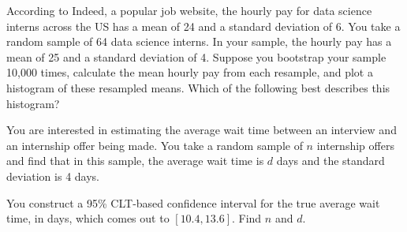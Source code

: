 \documentclass[twoside,12pt]{article}
\begin{document}
\begin{probset}
\begin{prob}
\begin{subprobset}
\begin{subprob}
        \smallskip
        
    
    \end{subprob}
\end{subprobset}

\end{prob}

\bigskip

\begin{prob}

According to Indeed, a popular job website, the hourly pay for data science interns across the US has a mean of 24 and a standard deviation of 6. You take a random sample of 64 data science interns. In your sample, the hourly pay has a mean of 25 and a standard deviation of 4. Suppose you bootstrap your sample 10,000 times, calculate the mean hourly pay from each resample, and plot a histogram of these resampled means. Which of the following best describes this histogram?


\smallskip


\smallskip


\smallskip


\smallskip


\end{prob}

\bigskip

\begin{prob}
You are interested in estimating the average wait time between an interview and an internship offer being made. You take a random sample of $n$ internship offers and find that in this sample, the average wait time is $d$ days and the standard deviation is 4 days. 

You construct a 95\% CLT-based confidence interval for the true average wait time, in days, which comes out to $[10.4, 13.6]$. Find $n$ and $d$.

    \begin{center}  
      
    \hspace{0.5in}
       
    \end{center}
    
\end{prob}
\end{probset}
\end{document}
